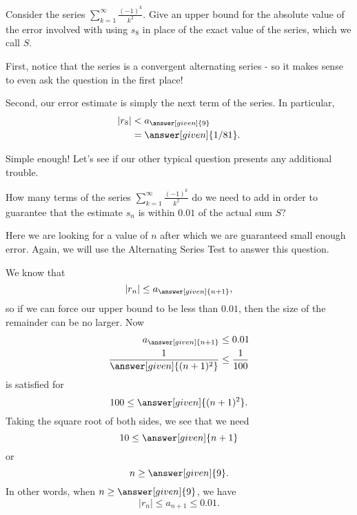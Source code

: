 \documentclass{ximera}
\begin{document}
%
%
\begin{example}
Consider the series $\sum_{k=1}^\infty \frac{(-1)^k}{k^2}$.  Give an upper bound for the absolute value of the error involved with using $s_8$ in place of the exact value of the series, which we call $S$.

\begin{explanation}
First, notice that the series is a convergent alternating series - so it makes sense to even ask the question in the first place!

Second, our error estimate is simply the next term of the series.  In particular, 
\begin{align*}
\vert r_8 \vert &< a_{\answer[given]{9}}\\
 &= \answer[given]{1/81}.
\end{align*}
\end{explanation}

\end{example}

Simple enough!  Let's see if our other typical question presents any additional trouble.

\begin{example}
How many terms of the series $\sum_{k=1}^{\infty}\frac{(-1)^k}{k^2}$ do we need to add in order to guarantee that the estimate $s_n$ is within $0.01$ of the actual sum $S$?
\begin{explanation}
Here we are looking for a value of $n$ after which we are guaranteed small enough error.  Again, we will use the Alternating Series Test to answer this question.

We know that
\[
\vert r_n \vert \leq a_{\answer[given]{n+1}},
\]
so if we can force our upper bound to be less than $0.01$, then the size of the remainder can be no larger.  Now
\begin{align*}
   a_{\answer[given]{n+1}} &\leq 0.01 \\
   \frac{1}{ \answer[given]{(n+1)^2}} & \leq \frac{1}{100}
\end{align*}
is satisfied for 
\[
100 \leq \answer[given]{(n+1)^2}.
\]
Taking the square root of both sides, we see that we need
\[
10 \leq \answer[given]{n+1}
\]
or
\[
n \geq \answer[given]{9}.
\]
In other words, when $n \geq \answer[given]{9}$, we have
\[
\vert r_n \vert \leq a_{n+1} \leq 0.01.
\]
\end{explanation}
\end{example}
\end{document}

